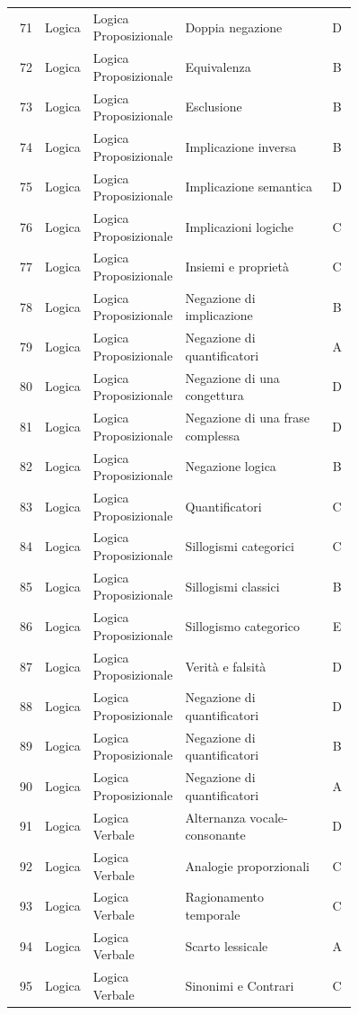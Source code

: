 \documentclass[20pt, a4paper]{article}
\begin{document}
\begin{longtable}{@{}r>{\raggedright\arraybackslash}p{0.14\linewidth}>{\raggedright\arraybackslash}p{0.20\linewidth}>{\raggedright\arraybackslash}p{0.42\linewidth}c@{}}
71 & Logica & Logica Proposizionale & Doppia negazione & D \\
72 & Logica & Logica Proposizionale & Equivalenza & B \\
73 & Logica & Logica Proposizionale & Esclusione & B \\
74 & Logica & Logica Proposizionale & Implicazione inversa & B \\
75 & Logica & Logica Proposizionale & Implicazione semantica & D \\
76 & Logica & Logica Proposizionale & Implicazioni logiche & C \\
77 & Logica & Logica Proposizionale & Insiemi e proprietà & C \\
78 & Logica & Logica Proposizionale & Negazione di implicazione & B \\
79 & Logica & Logica Proposizionale & Negazione di quantificatori & A \\
80 & Logica & Logica Proposizionale & Negazione di una congettura & D \\
81 & Logica & Logica Proposizionale & Negazione di una frase complessa & D \\
82 & Logica & Logica Proposizionale & Negazione logica & B \\
83 & Logica & Logica Proposizionale & Quantificatori & C \\
84 & Logica & Logica Proposizionale & Sillogismi categorici & C \\
85 & Logica & Logica Proposizionale & Sillogismi classici & B \\
86 & Logica & Logica Proposizionale & Sillogismo categorico & E \\
87 & Logica & Logica Proposizionale & Verità e falsità & D \\
88 & Logica & Logica Proposizionale & Negazione di quantificatori & D \\
89 & Logica & Logica Proposizionale & Negazione di quantificatori & B \\
90 & Logica & Logica Proposizionale & Negazione di quantificatori & A \\
91 & Logica & Logica Verbale & Alternanza vocale-consonante & D \\
92 & Logica & Logica Verbale & Analogie proporzionali & C \\
93 & Logica & Logica Verbale & Ragionamento temporale & C \\
94 & Logica & Logica Verbale & Scarto lessicale & A \\
95 & Logica & Logica Verbale & Sinonimi e Contrari & C \\

\end{longtable}
\end{document}
